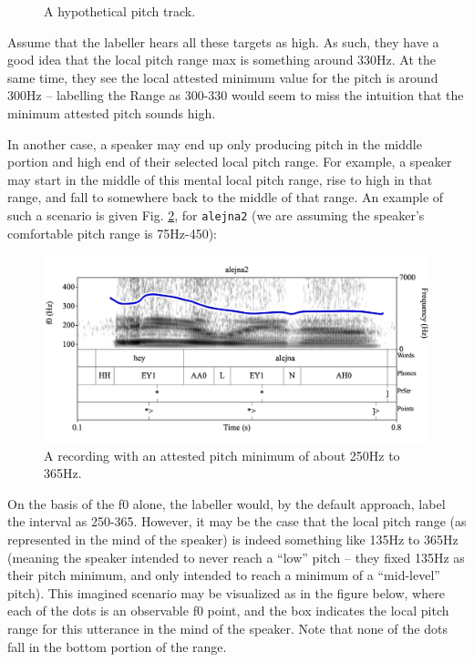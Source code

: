 \documentclass[11pt, twoside]{memoir}
\begin{document}
\begin{figure}[H]
\centering
%

%
\caption{A hypothetical pitch track.%
\label{fig:ranges-what-if3 Ranges Adv}%
}
\end{figure}

Assume that the labeller hears all these targets as high. As such, they have a good idea that the local pitch range max is something around 330Hz. At the same time, they see the local attested minimum value for the pitch is around 300Hz – labelling the Range as 300-330 would seem to miss the intuition that the minimum attested pitch sounds high.

In another case, a speaker may end up only producing pitch in the middle portion and high end of their selected local pitch range. For example, a speaker may start in the middle of this mental local pitch range, rise to high in that range, and fall to somewhere back to the middle of that range. An example of such a scenario is given Fig. \ref{fig:alejna2-nolabels}, for \texttt{alejna2} (we are assuming the speaker’s comfortable pitch range is 75Hz-450):

\begin{figure}[H]
\centering
%
\includegraphics[width=.875\linewidth]{Ranges-alejna2-nolabels.png}
%
\caption{A recording with an attested pitch minimum of about 250Hz to 365Hz.%
\label{fig:alejna2-nolabels}%
}
\end{figure}

On the basis of the f0 alone, the labeller would, by the default approach, label the interval as 250-365. However, it may be the case that the local pitch range (as represented in the mind of the speaker) is indeed something like 135Hz to 365Hz (meaning the speaker intended to never reach a “low” pitch – they fixed 135Hz as their pitch minimum, and only intended to reach a minimum of a “mid-level” pitch). This imagined scenario may be visualized as in the figure below, where each of the dots is an observable f0 point, and the box indicates the local pitch range for this utterance in the mind of the speaker. Note that none of the dots fall in the bottom portion of the range.
\end{document}
